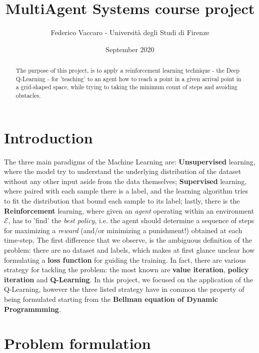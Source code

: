 \documentclass{article}
\title{MultiAgent Systems course project}
\author{Federico Vaccaro - Università degli Studi di Firenze }
\date{September 2020}
\begin{document}
\maketitle

\begin{abstract}
	The purpose of this project, is to apply a reinforcement learning technique - the Deep Q-Learning - for 'teaching' to an agent how to reach a point in a given arrival point in a grid-shaped space, while trying to taking the minimum count of steps and avoiding obstacles.
\end{abstract}


\section{Introduction}

The three main paradigms of the Machine Learning are: \textbf{Unsupervised} learning, where the model try to understand the underlying distribution of the dataset without any other input aside from the data themselves; \textbf{Supervised} learning, where paired with each sample there is a label, and the learning algorithm tries to fit the distribution that bound each sample to its label; lastly, there is the \textbf{Reinforcement} learning, where given an \textit{agent} operating within an environment $\mathcal{E}
$, has to 'find' the \textit{best policy}, i.e. the agent should determine a sequence of steps for maximizing a \textit{reward} (and/or minimizing a punishment!) obtained at each time-step. The first difference that we observe, is the ambiguous definition of the problem: there are no dataset and labels, which makes at first glance unclear how formulating a \textbf{loss function} for guiding the training. In fact, there are various strategy for tackling the problem: the most known are \textbf{value iteration}, \textbf{policy iteration} and \textbf{Q-Learning}. In this project, we focused on the application of the Q-Learning, however the three listed strategy have in common the property of being formulated starting from the \textbf{Bellman equation of Dynamic Programmming}. 

\section{Problem formulation}
\end{document}
